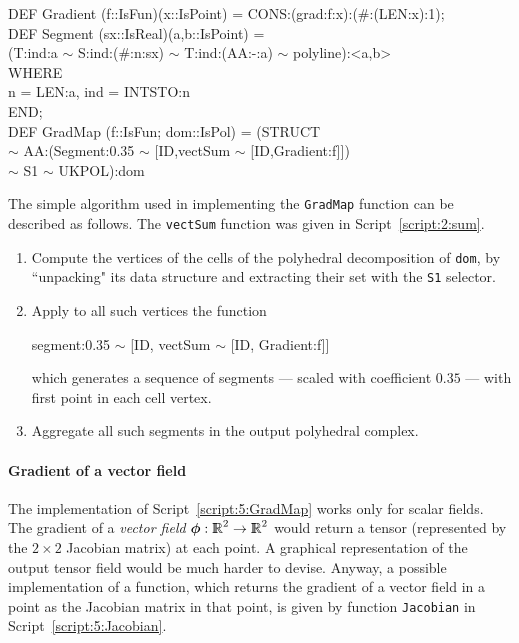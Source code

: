 \documentclass{31x47jw}
\begin{document}
\begin{script}
\begin{smallplasm} 
DEF Gradient  (f::IsFun)(x::IsPoint) = 
CONS:(grad:f:x):(\#:(LEN:x):1);\\[0.3cm]

DEF Segment  (sx::IsReal)(a,b::IsPoint) = \+\\
  (T:ind:a  $\sim$  S:ind:(\#:n:sx)  $\sim$  
  T:ind:(AA:-:a) $\sim$ polyline):<a,b>\-\\
WHERE \+\\
  n   = LEN:a, ind = INTSTO:n \-\\
END;\\[0.3cm]

DEF GradMap (f::IsFun; dom::IsPol) = (STRUCT\+\\
   $\sim$ AA:(Segment:0.35 $\sim$ [ID,vectSum $\sim$ [ID,Gradient:f]])\\
   $\sim$ S1 $\sim$ UKPOL):dom
\end{smallplasm} 
\label{script:5:GradMap}
\end{script}

The simple algorithm used in implementing the \texttt{GradMap}
function can be described as follows.  The \texttt{vectSum} function
was given in Script~\ref{script:2:sum}.
\begin{enumerate}
\item
Compute the vertices of the cells of the polyhedral decomposition of 
\texttt{dom}, by ``unpacking" its data structure and extracting their 
set with the \texttt{S1} selector.  
\item
Apply to all such vertices the function
\begin{smallplasm} 
segment:0.35 $\sim$ [ID, vectSum $\sim$ [ID, Gradient:f]]
\end{smallplasm} 
which generates a sequence of segments --- scaled with coefficient
$0.35$ --- with first point in each cell vertex.
\item
Aggregate all such segments in the output polyhedral complex.
\end{enumerate}

    
\paragraph{Gradient of a vector field}

The implementation of Script~\ref{script:5:GradMap} works only for
scalar fields.  The gradient of a \emph{vector field}
${\mbox{\boldmath $\phi$}}:\mathbb{I\!\!R}^{2}\rightarrow\mathbb{I\!\!R}^{2}$ would return a tensor (represented
by the $2\times 2$ Jacobian matrix) at each point.  A graphical
representation of the output tensor field would be much harder to
devise.  Anyway, a possible implementation of a function, which
returns the gradient of a vector field in a point as the Jacobian
matrix in that point, is given by function \texttt{Jacobian} in
Script~\ref{script:5:Jacobian}.
\end{document}
